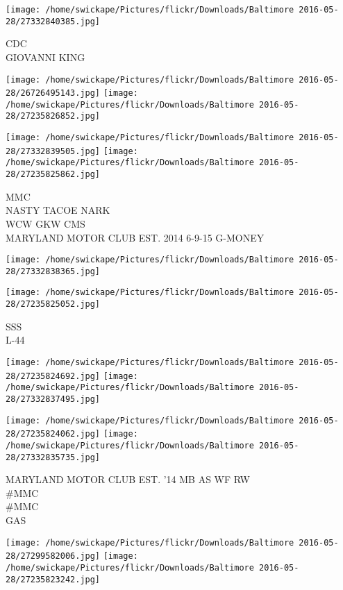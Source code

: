 \documentclass[10pt,letterpaper]{article}
\begin{document}
\vspace{0.25in}
\texttt{[image: /home/swickape/Pictures/flickr/Downloads/Baltimore 2016-05-28/27332840385.jpg]}

CDC\\
GIOVANNI KING\\
\pagebreak

\texttt{[image: /home/swickape/Pictures/flickr/Downloads/Baltimore 2016-05-28/26726495143.jpg]}
\texttt{[image: /home/swickape/Pictures/flickr/Downloads/Baltimore 2016-05-28/27235826852.jpg]}

\texttt{[image: /home/swickape/Pictures/flickr/Downloads/Baltimore 2016-05-28/27332839505.jpg]}
\texttt{[image: /home/swickape/Pictures/flickr/Downloads/Baltimore 2016-05-28/27235825862.jpg]}

MMC\\
NASTY TACOE NARK\\
WCW GKW CMS\\
MARYLAND MOTOR CLUB EST. 2014 6{-}9{-}15 G{-}MONEY\\
\pagebreak

\texttt{[image: /home/swickape/Pictures/flickr/Downloads/Baltimore 2016-05-28/27332838365.jpg]}

\vspace{0.25in}
\texttt{[image: /home/swickape/Pictures/flickr/Downloads/Baltimore 2016-05-28/27235825052.jpg]}

SSS\\
L{-}44\\
\pagebreak

\texttt{[image: /home/swickape/Pictures/flickr/Downloads/Baltimore 2016-05-28/27235824692.jpg]}
\texttt{[image: /home/swickape/Pictures/flickr/Downloads/Baltimore 2016-05-28/27332837495.jpg]}

\texttt{[image: /home/swickape/Pictures/flickr/Downloads/Baltimore 2016-05-28/27235824062.jpg]}
\texttt{[image: /home/swickape/Pictures/flickr/Downloads/Baltimore 2016-05-28/27332835735.jpg]}

MARYLAND MOTOR CLUB EST. '14 MB AS WF RW\\
\#MMC\\
\#MMC\\
GAS\\
\pagebreak

\texttt{[image: /home/swickape/Pictures/flickr/Downloads/Baltimore 2016-05-28/27299582006.jpg]}
\texttt{[image: /home/swickape/Pictures/flickr/Downloads/Baltimore 2016-05-28/27235823242.jpg]}
\end{document}
